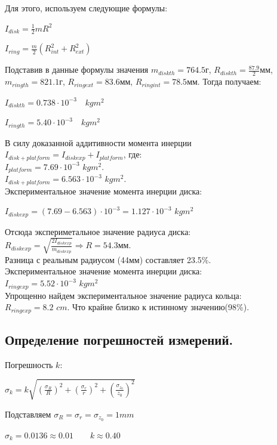 \documentclass[12pt,a4paper]{article}
\begin{document}
		Для этого, используем следующие формулы:
		
		\newpage
		
		\begin{flushleft}
			\begin{spacing}{1.6}
				$ I_{disk} = \frac{1}{2}mR^2 $
				
				$ I_{ring} = \frac{m}{2}(R_{int}^2 + R_{ext}^2)$
			\end{spacing}
		\end{flushleft}
		
		Подставив в данные формулы значения $ m_{disk th}=764.5$г, $ R_{disk th}=\frac{87.9}{2} $мм, $ m_{ring th}=821.1$г, $ R_{ring ext}=83.6$мм, $R_{ring int}=78.5$мм. Тогда получаем:		
		
		\begin{flushleft}
			\begin{spacing}{1.6}
				$ I_{disk th} =0.738 \cdot 10^{-3}  \quad kgm^2 $
				
				$ I_{ring th} =5.40 \cdot 10^{-3}  \quad kgm^2 $
			\end{spacing}
		\end{flushleft}

В силу доказанной аддитивности момента инерции $I_{disk+platform}=I_{disk exp}+I_{platform}$, где:\\
$I_{platform}=7.69\cdot 10^{-3}$ $kgm^2$.\\
$I_{disk+platform}=6.563\cdot 10^{-3}$ $kgm^2$.\\
Экспериментальное значение момента инерции диска:\\
\begin{spacing}{1.6}
$I_{disk exp}=(7.69-6.563)\cdot10^{-3}=1.127\cdot10^{-3}$ $kgm^2$
\end{spacing}
Отсюда экспериметальное значение радиуса диска: $R_{disk exp}=\sqrt{\frac{2I_{disk exp}}{m_{disk exp}}}\Rightarrow R=54.3$мм.\\
Разница с реальным радиусом (44мм) составляет 23.5\%.\\

Экспериментальное значение момента инерции диска:\\
$I_{ring exp}=5.52\cdot10^{-3}$ $kgm^2$\\
Упрощенно найдем экспериментальное значение радиуса кольца:\\
$R_{ring exp}=8.2$ $cm$. Что крайне близко к истинному значению(98\%).

      \subsection{Определение погрешностей измерений.}	 
Погрешность $k$:
\begin{flushleft}
			\begin{spacing}{1.4}
				$ \sigma_{k} = k\sqrt{\left(\frac{\sigma_{R}}{R}\right)^2 + \left(\frac{\sigma_{r}}{r}\right)^2 + \left(\frac{\sigma_{z_{0}}}{z_{0}}\right)^2} $

			   Подставляем  $\sigma_{R}=\sigma_{r}=\sigma_{z_{0}}=1mm\qquad$ 

				$ \sigma_{k} = 0.0136\approx0.01\qquad k \approx 0.40$
			\end{spacing} 
		\end{flushleft}
		
\end{document}
